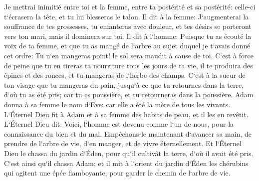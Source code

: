 \verse Je mettrai inimitié entre toi et la femme, entre ta postérité et sa postérité: celle-ci t`écrasera la tête, et tu lui blesseras le talon. 
\verse Il dit à la femme: J`augmenterai la souffrance de tes grossesses, tu enfanteras avec douleur, et tes désirs se porteront vers ton mari, mais il dominera sur toi. 
\verse Il dit à l`homme: Puisque tu as écouté la voix de ta femme, et que tu as mangé de l`arbre au sujet duquel je t`avais donné cet ordre: Tu n`en mangeras point! le sol sera maudit à cause de toi. C`est à force de peine que tu en tireras ta nourriture tous les jours de ta vie, 
\verse il te produira des épines et des ronces, et tu mangeras de l`herbe des champs. 
\verse C`est à la sueur de ton visage que tu mangeras du pain, jusqu`à ce que tu retournes dans la terre, d`où tu as été pris; car tu es poussière, et tu retourneras dans la poussière. 
\verse Adam donna à sa femme le nom d`Eve: car elle a été la mère de tous les vivants. 
\verse L`Éternel Dieu fit à Adam et à sa femme des habits de peau, et il les en revêtit. 
\verse L`Éternel Dieu dit: Voici, l`homme est devenu comme l`un de nous, pour la connaissance du bien et du mal. Empêchons-le maintenant d`avancer sa main, de prendre de l`arbre de vie, d`en manger, et de vivre éternellement. 
\verse Et l`Éternel Dieu le chassa du jardin d`Éden, pour qu`il cultivât la terre, d`où il avait été pris. 
\verse C`est ainsi qu`il chassa Adam; et il mit à l`orient du jardin d`Éden les chérubins qui agitent une épée flamboyante, pour garder le chemin de l`arbre de vie. 

